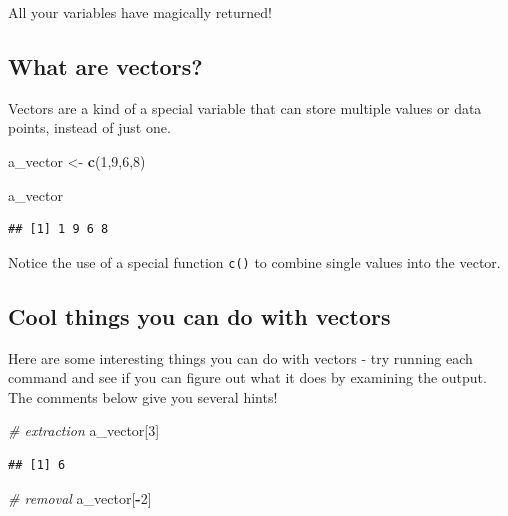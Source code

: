 \documentclass[
]{book}
\newenvironment{Shaded}{\begin{snugshade}}{\end{snugshade}}
\newcommand{\CommentTok}[1]{\textcolor[rgb]{0.56,0.35,0.01}{\textit{#1}}}
\newcommand{\DecValTok}[1]{\textcolor[rgb]{0.00,0.00,0.81}{#1}}
\newcommand{\FunctionTok}[1]{\textcolor[rgb]{0.13,0.29,0.53}{\textbf{#1}}}
\newcommand{\NormalTok}[1]{#1}
\newcommand{\OtherTok}[1]{\textcolor[rgb]{0.56,0.35,0.01}{#1}}
\newcommand{\SpecialCharTok}[1]{\textcolor[rgb]{0.81,0.36,0.00}{\textbf{#1}}}
\begin{document}
All your variables have magically returned!

\subsection{What are vectors?}\label{what-are-vectors}

Vectors are a kind of a special variable that can store multiple values or data points, instead of just one.

\begin{Shaded}
\begin{Highlighting}[]
\NormalTok{a\_vector }\OtherTok{\textless{}{-}} \FunctionTok{c}\NormalTok{(}\DecValTok{1}\NormalTok{,}\DecValTok{9}\NormalTok{,}\DecValTok{6}\NormalTok{,}\DecValTok{8}\NormalTok{)}

\NormalTok{a\_vector}
\end{Highlighting}
\end{Shaded}

\begin{verbatim}
## [1] 1 9 6 8
\end{verbatim}

Notice the use of a special function \texttt{c()} to combine single values into the vector.

\subsection{Cool things you can do with vectors}\label{cool-things-you-can-do-with-vectors}

Here are some interesting things you can do with vectors - try running each command and see if you can figure out what it does by examining the output. The comments below give you several hints!

\begin{Shaded}
\begin{Highlighting}[]
\CommentTok{\# extraction}
\NormalTok{a\_vector[}\DecValTok{3}\NormalTok{]}
\end{Highlighting}
\end{Shaded}

\begin{verbatim}
## [1] 6
\end{verbatim}

\begin{Shaded}
\begin{Highlighting}[]
\CommentTok{\# removal }
\NormalTok{a\_vector[}\SpecialCharTok{{-}}\DecValTok{2}\NormalTok{]}
\end{Highlighting}
\end{Shaded}
\end{document}
